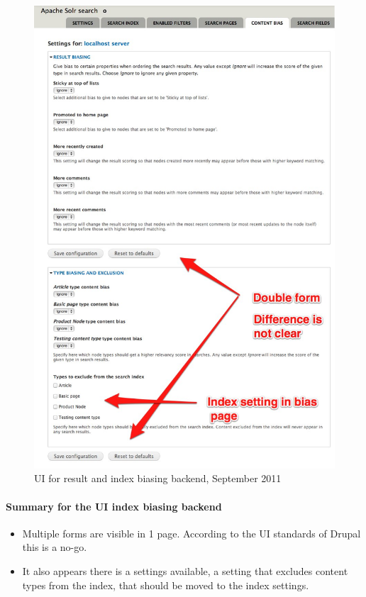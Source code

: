 \begin{figure}[H]
     \includegraphics[width=\textwidth/(2)]{images/apachesolr_ui_backend_september_2011_4.jpg}
     \caption{UI for result and index biasing backend, September 2011}
\end{figure}
\paragraph{Summary for the UI index biasing backend}
\begin{itemize}
\item Multiple forms are visible in 1 page. According to the UI standards of Drupal this is a no-go.
\item It also appears there is a settings available, a setting that excludes content types from the index, that should be moved to the index settings. 
\end{itemize}

